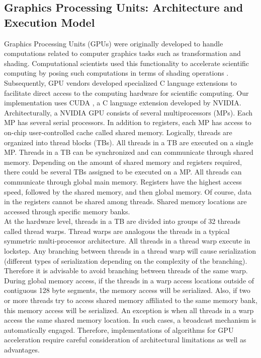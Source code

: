 \documentclass[10pt]{article}
\begin{document}
\subsection*{Graphics Processing Units: Architecture and Execution Model}
Graphics Processing Units (GPUs) were originally developed to handle computations related to computer graphics tasks such as transformation and shading. Computational scientists used this functionality to accelerate scientific computing by posing such computations in terms of shading operations \cite{Owens:2007}. Subsequently, GPU vendors developed specialized C language extensions to facilitate direct access to the computing hardware for scientific computing. Our implementation uses CUDA \cite{Sanders:2010}, a C language extension developed by NVIDIA.\\

Architecturally, a NVIDIA GPU consists of several multiprocessors (MPs). Each MP has several serial processors. In addition to registers, each MP has access to on-chip user-controlled cache called shared memory. Logically, threads are organized into thread blocks (TBs). All threads in a TB are executed on a single MP. Threads in a TB can be synchronized and can communicate through shared memory. Depending on the amount of shared memory and registers required, there could be several TBs assigned to be executed on a MP. All threads can communicate through global main memory. Registers have the highest access speed, followed by the shared memory, and then global memory. Of course, data in the registers cannot be shared among threads. Shared memory locations are accessed through specific memory banks.\\

At the hardware level, threads in a TB are divided into groups of 32 threads called thread warps. Thread warps are analogous the threads in a typical symmetric multi-processor architecture.  All threads in a thread warp execute in lockstep. Any branching between threads in a thread warp will cause serialization (different types of serialization depending on the complexity of the branching). Therefore it is advisable to avoid branching between threads of the same warp. During global memory access, if the threads in a warp access locations outside of contiguous 128 byte segments, the memory access will be serialized. Also, if two or more threads try to access shared memory affiliated to the same memory bank, this memory access will be serialized. An exception is when all threads in a warp access the same shared memory location. In such cases, a broadcast mechanism is automatically engaged. Therefore, implementations of algorithms for GPU acceleration require careful consideration of architectural limitations as well as advantages. \\
\end{document}
